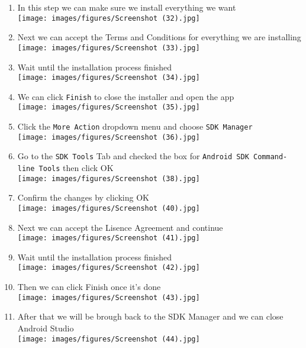 \documentclass[12pt,titlepage]{article}
\begin{document}
\begin{enumerate}
    \newpage
    \item In this step we can make sure we install everything we want \\ \texttt{[image: images/figures/Screenshot (32).jpg]}
    \item Next we can accept the Terms and Conditions for everything we are installing \\ \texttt{[image: images/figures/Screenshot (33).jpg]}
    \newpage
    \item Wait until the installation process finished \\ \texttt{[image: images/figures/Screenshot (34).jpg]}
    \item We can click \texttt{Finish} to close the installer and open the app \\ \texttt{[image: images/figures/Screenshot (35).jpg]}
    \newpage
    \item Click the \texttt{More Action} dropdown menu and choose \texttt{SDK Manager} \\ \texttt{[image: images/figures/Screenshot (36).jpg]}
    \item Go to the \texttt{SDK Tools} Tab and checked the box for \texttt{Android SDK Command-line Tools} then click OK\\ \texttt{[image: images/figures/Screenshot (38).jpg]}
    \newpage
    \item Confirm the changes by clicking OK \\ \texttt{[image: images/figures/Screenshot (40).jpg]}
    \item Next we can accept the Lisence Agreement and continue \\ \texttt{[image: images/figures/Screenshot (41).jpg]}
    \newpage
    \item Wait until the installation process finished \\ \texttt{[image: images/figures/Screenshot (42).jpg]}
    \item Then we can click Finish once it's done \\ \texttt{[image: images/figures/Screenshot (43).jpg]}
    \newpage
    \item After that we will be brough back to the SDK Manager and we can close Android Studio \\ \texttt{[image: images/figures/Screenshot (44).jpg]}

\end{enumerate}
\end{document}
